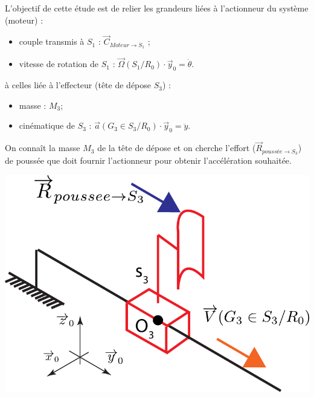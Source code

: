 \documentclass[10pt,fleqn]{article} %
\begin{document}
\begin{multicols}{2}
\begin{obj}
L'objectif de cette étude est de relier les grandeurs liées à l'actionneur du système (moteur) :
\begin{itemize}
\item couple transmis à $S_1$ : $\overrightarrow{C}_{Moteur\to S_1}$ ;
\item vitesse de rotation de $S_1$ : $\overrightarrow{\Omega}(S_1/R_0)\cdot \overrightarrow{y}_0=\dot{\theta}$.
\end{itemize} 
à celles liée à l'effecteur (tête de dépose $S_3$) : 
\begin{itemize}
\item masse : $M_3$;
\item cinématique de $S_3$ : $\overrightarrow{a}(G_3\in S_3/R_0)\cdot \overrightarrow{y}_0=\ddot{y}$.
\end{itemize}
\end{obj}



\begin{exemple}
\begin{minipage}{0.35\textwidth}
On connaît la masse $M_3$ de la tête de dépose et on cherche l'effort ($\overrightarrow{R}_{poussée\to S_3}$) de poussée que doit fournir l'actionneur pour obtenir l'accélération souhaitée.
\end{minipage}
\begin{minipage}{0.55\textwidth}
\begin{center}
\includegraphics[width=1.0\textwidth]{images/schema_cine_depose_translation.pdf}
\end{center}
\end{minipage}


\end{exemple}
\end{multicols}
\end{document}
